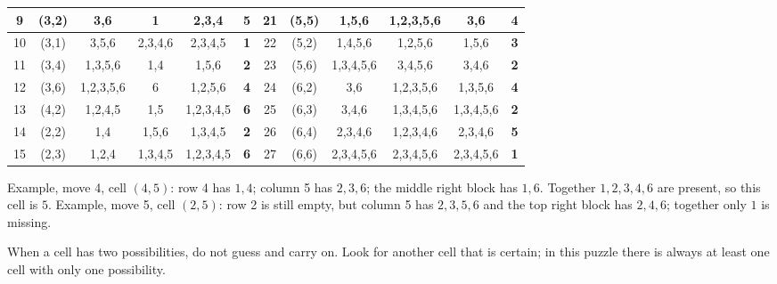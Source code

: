 {\begin{center}
\begin{tabular}{|c|c|c|c|c|c||c|c|c|c|c|c|}
9 & (3,2) & 3,6 & 1 & 2,3,4 & \textbf{5} & 21 & (5,5) & 1,5,6 & 1,2,3,5,6 & 3,6 & \textbf{4}\\ \hline
10 & (3,1) & 3,5,6 & 2,3,4,6 & 2,3,4,5 & \textbf{1} & 22 & (5,2) & 1,4,5,6 & 1,2,5,6 & 1,5,6 & \textbf{3}\\ \hline
11 & (3,4) & 1,3,5,6 & 1,4 & 1,5,6 & \textbf{2} & 23 & (5,6) & 1,3,4,5,6 & 3,4,5,6 & 3,4,6 & \textbf{2}\\ \hline
12 & (3,6) & 1,2,3,5,6 & 6 & 1,2,5,6 & \textbf{4} & 24 & (6,2) & 3,6 & 1,2,3,5,6 & 1,3,5,6 & \textbf{4}\\ \hline
13 & (4,2) & 1,2,4,5 & 1,5 & 1,2,3,4,5 & \textbf{6} & 25 & (6,3) & 3,4,6 & 1,3,4,5,6 & 1,3,4,5,6 & \textbf{2}\\ \hline
14 & (2,2) & 1,4 & 1,5,6 & 1,3,4,5 & \textbf{2} & 26 & (6,4) & 2,3,4,6 & 1,2,3,4,6 & 2,3,4,6 & \textbf{5}\\ \hline
15 & (2,3) & 1,2,4 & 1,3,4,5 & 1,2,3,4,5 & \textbf{6} & 27 & (6,6) & 2,3,4,5,6 & 2,3,4,5,6 & 2,3,4,5,6 & \textbf{1}\\ \hline
\end{tabular}
\end{center}
Example, move 4, cell $(4,5)$: row 4 has $1, 4$; column 5 has $2, 3, 6$; the middle right block has $1, 6$. Together $1, 2, 3, 4, 6$ are
present, so this cell is $5$. Example, move 5, cell $(2,5)$: row 2 is still empty, but column 5 has $2, 3, 5, 6$ and the top right
block has $2, 4, 6$; together only $1$ is missing.
\begin{figC}
\end{figC}
\begin{warnbox}When a cell has two possibilities, do not guess and carry on. Look for another cell that is certain; in this puzzle there is
always at least one cell with only one possibility.\end{warnbox}
}

